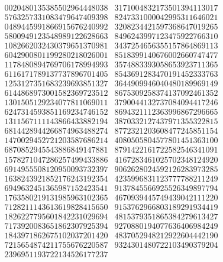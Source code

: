 {\scriptsize
\[\begin{array}{rr}
0020480135385502964448038 &
3171004832173501394113017 \\
5763257331083479647409398 &
8247331000042995311646021 \\
0489445991866915676240992 &
3208234421597368647019265 \\
5800949123548989122628663 &
8496243997123475922766310 \\
1082662032430379651370981 &
3437254656355157864869113 \\
6042900801199280218026001 &
8518399140676002660747477 \\
1178480894769706178994993 &
3574883393058653923711365 \\
6116171789137737896701405 &
8543691283470191452333763 \\
1253127351683239693851327 &
3644909946040480189969149 \\
6144868973001582369723512 &
8675309258374137092461352 \\
1301505129234077811069011 &
3790044132737084094417246 \\
6247314593851169234746152 &
8694321112363996867296665 \\
1311567111143866433882194 &
3870332127437971355322815 \\
6814428944266874963488274 &
8772321203608477245851154 \\
1470029452721203587686214 &
4080505804577801451363100 \\
6870852945543886849147881 &
8791422161722582546341091 \\
1578271047286257499433886 &
4167283461025702348124920 \\
6914955508120950093732397 &
9062628024592126283973285 \\
1638243921852176243192354 &
4235996831123777788211249 \\
6949632451365987152423541 &
9137845566925526349897794 \\
1763580219131985963102365 &
4670939445749439042111220 \\
7128211143613619828415650 &
9153762966803189291934419 \\
1826227795601842231029694 &
4815379351865384279613427 \\
7173920083651862307925394 &
9270880194077636406984249 \\
1843971862675102037201420 &
4837052948212922604442190 \\
7215654874211755676220587 &
9324301480722103490379204 \\
2396951193722134526177237 &

\end{array}\]}
